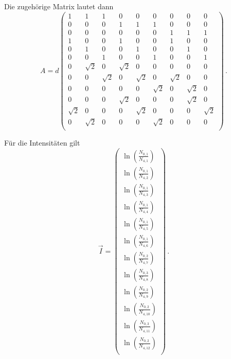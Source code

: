 Die zugehörige Matrix lautet dann
\begin{equation}
  A= d
  \left(
  \begin{array}{rrrrrrrrr}
    1 & 1 & 1 & 0 & 0 & 0 & 0 & 0 & 0 \\
    0 & 0 & 0 & 1 & 1 & 1 & 0 & 0 & 0 \\
    0 & 0 & 0 & 0 & 0 & 0 & 1 & 1 & 1 \\
    1 & 0 & 0 & 1 & 0 & 0 & 1 & 0 & 0 \\
    0 & 1 & 0 & 0 & 1 & 0 & 0 & 1 & 0 \\
    0 & 0 & 1 & 0 & 0 & 1 & 0 & 0 & 1 \\
    0 & \sqrt{2} & 0 & \sqrt{2} & 0 & 0 & 0 & 0 & 0 \\
    0 & 0 & \sqrt{2} & 0 & \sqrt{2} & 0 & \sqrt{2} & 0 & 0 \\
    0 & 0 & 0 & 0 & 0 & \sqrt{2} & 0 & \sqrt{2} & 0 \\
    0 & 0 & 0 & \sqrt{2} & 0 & 0 & 0 & \sqrt{2} & 0 \\
    \sqrt{2} & 0 & 0 & 0 & \sqrt{2} & 0 & 0 & 0 & \sqrt{2} \\
    0 & \sqrt{2} & 0 & 0 & 0 & \sqrt{2} & 0 & 0 & 0 \\
  \end{array}
  \right)\,.
\end{equation}

Für die Intensitäten gilt
\begin{equation*}
  \vec{I}=   \left(
    \begin{array}{r}
      \ln\left(\frac{N_{0,1}}{N_{4,1}} \right) \\
      \ln\left(\frac{N_{0,1}}{N_{4,2}} \right) \\
      \ln\left(\frac{N_{0,1}}{N_{4,3}} \right) \\
      \ln\left(\frac{N_{0,1}}{N_{4,4}} \right) \\
      \ln\left(\frac{N_{0,1}}{N_{4,5}} \right) \\
      \ln\left(\frac{N_{0,1}}{N_{4,6}} \right) \\
      \ln\left(\frac{N_{0,2}}{N_{4,7}} \right) \\
      \ln\left(\frac{N_{0,3}}{N_{4,8}} \right) \\
      \ln\left(\frac{N_{0,2}}{N_{4,9}} \right) \\
      \ln\left(\frac{N_{0,2}}{N_{4,10}} \right) \\
      \ln\left(\frac{N_{0,3}}{N_{4,11}} \right) \\
      \ln\left(\frac{N_{0,2}}{N_{4,12}} \right) \\
    \end{array}
    \right) \,.
\end{equation*}

